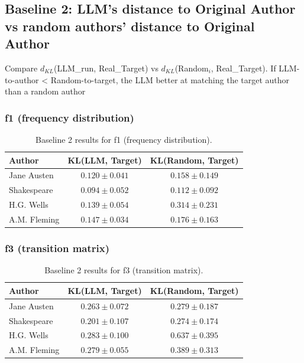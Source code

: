 \documentclass{article}
\begin{document}
\subsection{Baseline 2: LLM's distance to Original Author vs random authors' distance to Original Author}

Compare $d_{KL}$(LLM\_run, Real\_Target) vs $d_{KL}$(Random$_i$, Real\_Target). If LLM-to-author < Random-to-target, the LLM better at matching the target author than a random author

\subsubsection{f1 (frequency distribution)}

\begin{table}[htbp]
\centering
\begin{tabular}{lcc}
\toprule
Author & KL(LLM, Target) & KL(Random, Target) \\
\midrule
Jane Austen & $0.120 \pm 0.041$ & $0.158 \pm 0.149$ \\
Shakespeare & $0.094 \pm 0.052$ & $0.112 \pm 0.092$ \\
H.G. Wells & $0.139 \pm 0.054$ & $0.314 \pm 0.231$ \\
A.M. Fleming & $0.147 \pm 0.034$ & $0.176 \pm 0.163$ \\
\bottomrule
\end{tabular}
\caption{Baseline 2 results for f1 (frequency distribution).}
\label{tab:baseline2_f1}
\end{table}

\subsubsection{f3 (transition matrix)}

\begin{table}[htbp]
\centering
\begin{tabular}{lcc}
\toprule
Author & KL(LLM, Target) & KL(Random, Target) \\
\midrule
Jane Austen & $0.263 \pm 0.072$ & $0.279 \pm 0.187$ \\
Shakespeare & $0.201 \pm 0.107$ & $0.274 \pm 0.174$ \\
H.G. Wells & $0.283 \pm 0.100$ & $0.637 \pm 0.395$ \\
A.M. Fleming & $0.279 \pm 0.055$ & $0.389 \pm 0.313$ \\
\bottomrule
\end{tabular}
\caption{Baseline 2 results for f3 (transition matrix).}
\label{tab:baseline2_f3}
\end{table}
\end{document}

